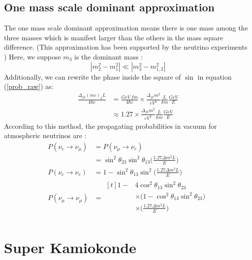 \documentclass[12pt]{article}
\begin{document}
\begin{multicols}{2}
        \subsection{One mass scale dominant approximation}
        The one mass scale dominant approximation means there is one mass among the three masses which is manifest larger than the others in the mass square difference. (This approximation has been supported by the neutrino experiments \cite{SKexp}) Here, we suppose $m_3$ is the dominant mass :
        \[
            |m_{2}^{2} - m_{1}^{2}| \ll |m_{3}^{2} - m_{1,2}^{2}|
        \]
        Additionally, we can rewrite the phase inside the square of $\sin$ in equation (\ref{prob_raw}) as:
        \begin{align*}
            \frac{\Delta_{jk}(mc)_{2}L}{4 \hbar c} &= \frac{GeV\ fm}{4 \hbar c} \times \frac{\Delta_{jk} m^2}{eV^2} \frac{L}{km} \frac{GeV}{E}\\
            &\approx 1.27 \times \frac{\Delta_{jk} m^2}{eV^2} \frac{L}{km} \frac{GeV}{E}
        \end{align*}
        According to this method, the propagating probabilities in vacuum for atmospheric neutrinos are \cite{SKexp} : 
        \begin{align*}
                P(\nu_{e} \rightarrow \nu_{\mu})    &= P(\nu_{\mu}\rightarrow \nu_{e})\\
                                                    &= \sin^{2}\theta_{23} \sin^{2}\theta_{13} \Big( \frac{1.27 \Delta m^{2} L}{E} \Big)\\
                P(\nu_{e} \rightarrow \nu_{e})      &= 1 - \sin^{2}\theta_{13}\sin^{2} \Big( \frac{1.27\Delta m^{2} L}{E} \Big)\\ 
                P(\nu_{\mu} \rightarrow \nu_{\mu})  &= \begin{aligned}[t]
                                                            1 - &4 \cos^{2}\theta_{13}\sin^{2}\theta_{23}\\
                                                                &\times \big( 1 - \cos^{2}\theta_{13}\sin^{2} \theta_{23} \big)\\
                                                                &\times \Big( \frac{1.27\Delta m^{2} L}{E} \Big)\\
                                                        \end{aligned}
        \end{align*}


\section{Super Kamiokonde}



\end{multicols}
\end{document}
